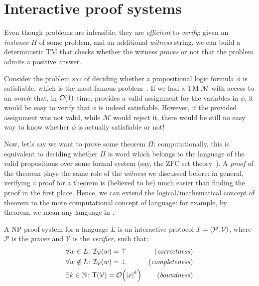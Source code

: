 \section{Interactive proof systems}
Even though \NPcomplete{} problems are infeasible, they are \emph{efficient} to \emph{verify}: 
given an \emph{instance} \(\Pi \) of some \NPcomplete{} problem, and an additional \emph{witness}
string, we can build a deterministic TM that checks whether the witness \emph{proves} or 
not that the problem admits a positive answer.
\begin{example}
  Consider the problem \textsc{sat} of deciding whether a propositional logic formula \(\phi \) is 
  satisfiable, which is the most famous \NPcomplete{} problem~\cite{Cook1971}. 
  If we had a TM \(\mathcal{M}\) with access to an \emph{oracle} that, in \(\BigO{1}\) time, 
  provides a valid assignment for the variables in \(\phi \), it would be easy to 
  verify that \(\phi \) is indeed satisfiable.
  However, if the provided assignment was not valid, while \(\mathcal{M}\) would reject it, 
  there would be still no easy way to know whether \(\phi \) is actually satisfiable or not! 
\end{example}

Now, let's say we want to prove some theorem \(\Pi \): computationally, this is equivalent to 
deciding whether \(\Pi \) is word which belongs to the language of the valid propositions over some 
formal system (say, the ZFC set theory~\cite{FraenkelHL1973}).
A \emph{proof} of the theorem plays the same role of the \emph{witness} we discussed before: in 
general, verifying a proof for a theorem is (believed to be) much easier than finding the proof in 
the first place.
Hence, we can extend the logical/mathematical concept of theorem to the more computational concept 
of language: for example, by \NPtime{} theorem, we mean any language in \NPtime{}.

\clearpage
\begin{definition}  
  A \textsc{NP} proof system for a language \(L\) is an interactive protocol 
  \(\mathcal{I} = \left(\mathcal{P}, \mathcal{V}\right)\), where \(\mathcal{P}\) is the \emph{prover}
  and \(\mathcal{V}\) is the \emph{verifier}, such that:
  \begin{align*}
    & \forall w \in L\colon \call{\mathcal{I}_{\mathcal{V}}}{w} = \top & 
      \textnormal{(\emph{correctness})} \\
    & \forall w \notin L\colon \call{\mathcal{I}_{\mathcal{V}}}{w} = \bot & 
      \textnormal{(\emph{completeness})} \\
    & \exists k \in \mathbb{N}\colon \call{\Time}{\mathcal{V}} = \BigO{\abs{x}^k} & 
    \textnormal{(\emph{boundness})}
  \end{align*}
\end{definition}

